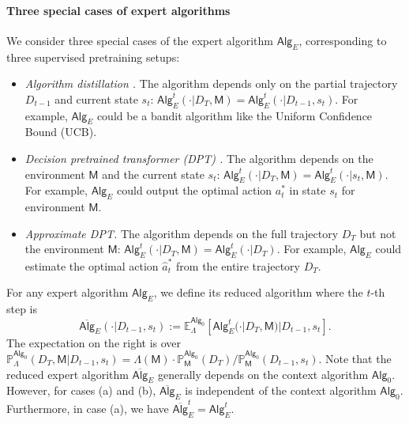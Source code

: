 \documentclass[10pt]{article}
\newcommand{\<}{\left\langle}
\renewcommand{\>}{\right\rangle}
\newcommand{\E}{\mathbb{E}}
\renewcommand{\P}{\mathbb{P}}
\newcommand{\inst}{{\mathsf{M}}}
\newcommand{\state}{{s}}
\newcommand{\action}{{a}}
\newcommand{\totlen}{{T}}
\newcommand{\sAlg}{{\mathsf{Alg}}}
\newcommand{\osAlg}{\overline{\mathsf{Alg}}}
\newcommand{\dset}{{D}}
\newcommand{\prior}{{\Lambda}}
\newcommand{\shortexp}{{E}}
\begin{document}
\paragraph{Three special cases of expert algorithms} We consider three special cases of the expert algorithm $\sAlg_{\shortexp}$, corresponding to three supervised pretraining setups:
\begin{itemize}[leftmargin=1.5em]
\item[(a)] {\it Algorithm distillation \citep{laskin2022context}. } The algorithm depends only on the partial trajectory $\dset_{t-1}$ and current state $\state_t$: $\sAlg_{\shortexp}^t(\cdot|\dset_{\totlen},\inst) = \sAlg_{\shortexp}^t(\cdot|\dset_{t-1},\state_t)$. For example, $\sAlg_{\shortexp}$ could be a bandit algorithm like the Uniform Confidence Bound (UCB).
\item[(b)] {\it Decision pretrained transformer (DPT) \citep{lee2023supervised}. } The algorithm depends on the environment $\inst$ and the current state $s_t$: $\sAlg_{\shortexp}^t(\cdot|\dset_\totlen, \inst) = \sAlg_{\shortexp}^t(\cdot|s_t, \inst)$. For example,  $\sAlg_{\shortexp}$ could output the optimal action $\action^*_t$ in state $\state_t$ for environment $\inst$.
\item[(c)]{\it Approximate DPT. } The algorithm depends on the full trajectory $\dset_{\totlen}$ but not the environment $\inst$: $\sAlg_{\shortexp}^t(\cdot|\dset_\totlen, \inst) =\sAlg_{\shortexp}^t(\cdot|\dset_\totlen)$. For example, $\sAlg_{\shortexp}$ could estimate the optimal action $\widehat \action^*_t$ from the entire trajectory $\dset_\totlen$.
\end{itemize}
For any expert algorithm $\sAlg_{\shortexp}$, we define its reduced algorithm where the $t$-th step is $$\osAlg_{\shortexp}(\cdot|\dset_{t-1},\state_t) := \E_\prior^{\sAlg_0}[\sAlg_{\shortexp}^t(\cdot|\dset_\totlen,\inst)|\dset_{t-1},\state_t].$$ The expectation on the right is over $\P_{\prior}^{\sAlg_0} ( \dset_\totlen, \inst |\dset_{t-1},\state_t) =\prior(\inst) \cdot \P_\inst^{\sAlg_0}(\dset_\totlen) / \P_\inst^{\sAlg_0}(\dset_{t-1},\state_t).$ Note that the reduced expert algorithm $\osAlg_{\shortexp}$ generally depends on the context algorithm $\sAlg_0$. However, for cases (a) and (b), $\osAlg_{\shortexp}$ is independent of the context algorithm $\sAlg_0$. Furthermore, in case (a), we have $\osAlg_{\shortexp}^t = \sAlg_{\shortexp}^t$.
\end{document}
